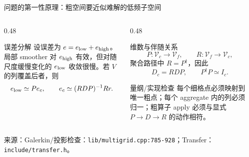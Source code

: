 \documentclass[UTF8,aspectratio=169,11pt]{ctexbeamer}
\newcommand{\source}[1]{\vspace{0.04em}\par\noindent\parbox[t]{0.96\linewidth}{\raggedright\tiny\color{muted}来源：#1\par}}
\newcommand{\codepath}[1]{\nolinkurl{#1}}
\begin{document}
\begin{frame}[t]{问题的第一性原理：粗空间要近似难解的低频子空间}
  \footnotesize
  \begin{columns}[T,totalwidth=\textwidth]
    \begin{column}{0.48\textwidth}
      \begin{block}{误差分解}
        设误差为 $e=e_{\rm low}+e_{\rm high}$。局部 smoother 对 $e_{\rm high}$ 有效，但对随尺度缓慢变化的 $e_{\rm low}$ 收敛很慢。若 $V$ 的列覆盖后者，则
        \begin{equation*}
          e_{\rm low}\simeq P e_c,\qquad
          e_c\simeq (RDP)^{-1}Rr.
        \end{equation*}
      \end{block}
    \end{column}
    \begin{column}{0.48\textwidth}
      \begin{block}{维数与伴随关系}
        \begin{equation*}
          P:\mathcal V_c\to\mathcal V_f,\qquad
          R:\mathcal V_f\to\mathcal V_c,
        \end{equation*}
        聚合路径中 $R=P^\dagger$，因此
        \begin{equation*}
          D_c=RDP,\qquad P^\dagger P\simeq I_c.
        \end{equation*}
      \end{block}
      \begin{block}{量纲/实现检查}
        每个细格点必须映射到唯一粗点；每个 aggregate 内的列必须归一；粗算子 apply 必须与显式 $P\to D\to R$ 的动作相符。
      \end{block}
    \end{column}
  \end{columns}
  \vspace{0.02cm}
  \begin{center}
  \end{center}
  \source{Galerkin/投影检查：\codepath{lib/multigrid.cpp:785-928}；Transfer：\codepath{include/transfer.h}。}
\end{frame}
\end{document}
